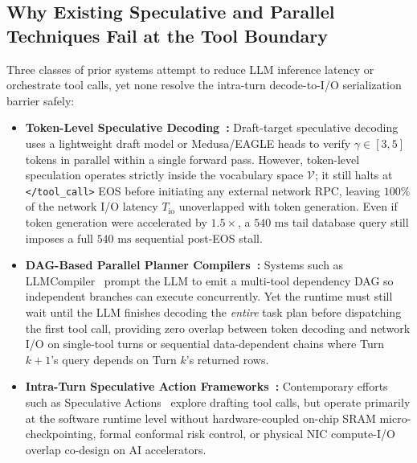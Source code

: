 \documentclass[10pt,conference]{IEEEtran}
\begin{document}
\subsection{Why Existing Speculative and Parallel Techniques Fail at the Tool Boundary}
Three classes of prior systems attempt to reduce LLM inference latency or orchestrate tool calls, yet none resolve the intra-turn decode-to-I/O serialization barrier safely:
\begin{itemize}
    \item \textbf{Token-Level Speculative Decoding~\cite{leviathan2023fast, chen2023accelerating, cai2024medusa, li2024eagle}:} Draft-target speculative decoding uses a lightweight draft model or Medusa/EAGLE heads to verify $\gamma \in [3, 5]$ tokens in parallel within a single forward pass. However, token-level speculation operates strictly inside the vocabulary space $\mathcal{V}$; it still halts at \texttt{</tool\_call>} EOS before initiating any external network RPC, leaving $100\%$ of the network I/O latency $T_{\text{io}}$ unoverlapped with token generation. Even if token generation were accelerated by $1.5\times$, a $540\text{ ms}$ tail database query still imposes a full $540\text{ ms}$ sequential post-EOS stall.
    \item \textbf{DAG-Based Parallel Planner Compilers~\cite{kim2024llmcompiler, geng2025sagallm}:} Systems such as LLMCompiler~\cite{kim2024llmcompiler} prompt the LLM to emit a multi-tool dependency DAG so independent branches can execute concurrently. Yet the runtime must still wait until the LLM finishes decoding the \emph{entire} task plan before dispatching the first tool call, providing zero overlap between token decoding and network I/O on single-tool turns or sequential data-dependent chains where Turn $k+1$'s query depends on Turn $k$'s returned rows.
    \item \textbf{Intra-Turn Speculative Action Frameworks~\cite{ye2025speculative}:} Contemporary efforts such as Speculative Actions~\cite{ye2025speculative} explore drafting tool calls, but operate primarily at the software runtime level without hardware-coupled on-chip SRAM micro-checkpointing, formal conformal risk control, or physical NIC compute-I/O overlap co-design on AI accelerators.

\end{itemize}
\end{document}
